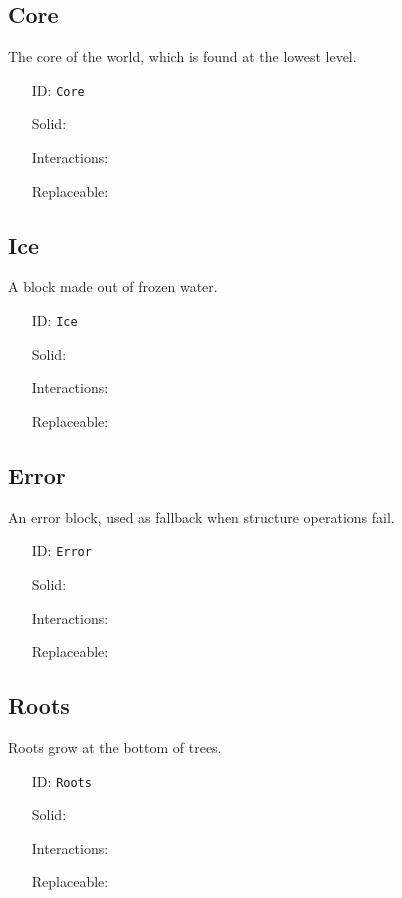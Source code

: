 \subsection{Core}\label{subsec:blocks_core}
The core of the world, which is found at the lowest level.
\newline
\begin{itemize}[nosep]
\item[ID:] \texttt{Core}
\item[Solid:]  \Checkmark \item[Interactions:]  \XSolidBrush \item[Replaceable:]  \XSolidBrush \end{itemize}

\subsection{Ice}\label{subsec:blocks_ice}
A block made out of frozen water.
\newline
\begin{itemize}[nosep]
\item[ID:] \texttt{Ice}
\item[Solid:]  \Checkmark \item[Interactions:]  \Checkmark \item[Replaceable:]  \XSolidBrush \end{itemize}

\subsection{Error}\label{subsec:blocks_error}
An error block, used as fallback when structure operations fail.
\newline
\begin{itemize}[nosep]
\item[ID:] \texttt{Error}
\item[Solid:]  \Checkmark \item[Interactions:]  \XSolidBrush \item[Replaceable:]  \XSolidBrush \end{itemize}

\subsection{Roots}\label{subsec:blocks_roots}
Roots grow at the bottom of trees.
\newline
\begin{itemize}[nosep]
\item[ID:] \texttt{Roots}
\item[Solid:]  \Checkmark \item[Interactions:]  \XSolidBrush \item[Replaceable:]  \XSolidBrush \end{itemize}

